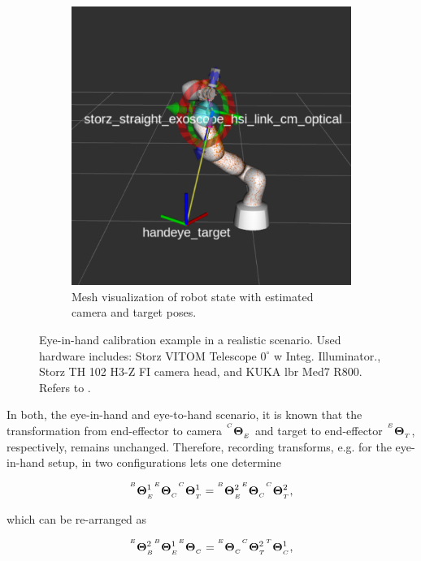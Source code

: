 \begin{figure}[htb]
\begin{subfigure}[b]{0.49\textwidth}
        \includegraphics[width=\textwidth]{introduction/img/aruco_world.png}
        \caption{Mesh visualization of robot state with estimated camera and target poses.}
    \end{subfigure}
    \caption{Eye-in-hand calibration example in a realistic scenario. Used hardware includes: Storz VITOM Telescope $0^\circ$ w Integ. Illuminator., Storz TH 102 H3-Z FI camera head, and KUKA \gls{lbr} Med7 R800. Refers to .}
    \label{in:fig:eye_in_hand_setup}
\end{figure}
In both, the eye-in-hand and eye-to-hand scenario, it is known that the transformation from end-effector to camera ${}^{^C}\mathbf{\Theta}_{_E}$ and target to end-effector ${}^{^E}\mathbf{\Theta}_{_T}$, respectively, remains unchanged. Therefore, recording transforms, e.g. for the eye-in-hand setup, in two configurations lets one determine

\begin{equation}
    {}^{^B}\mathbf{\Theta}_{_E}^{1}{}^{^E}\mathbf{\Theta}_{_C}{}^{^C}\mathbf{\Theta}_{_T}^{1} = {}^{^B}\mathbf{\Theta}_{_E}^{2}{}^{^E}\mathbf{\Theta}_{_C}{}^{^C}\mathbf{\Theta}_{_T}^{2},
\end{equation}

which can be re-arranged as

\begin{equation}
    {}^{^E}\mathbf{\Theta}_{_B}^{2}{}^{^B}\mathbf{\Theta}_{_E}^{1}{}^{^E}\mathbf{\Theta}_{_C} = {}^{^E}\mathbf{\Theta}_{_C}{}^{^C}\mathbf{\Theta}_{_T}^{2}{}^{^T}\mathbf{\Theta}_{_C}^{1},
\end{equation}

